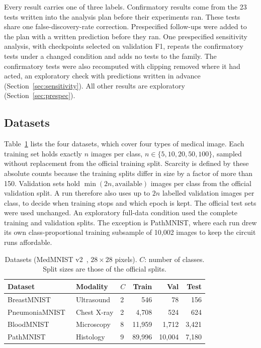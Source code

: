 \documentclass{ieeeaccess}
\begin{document}
Every result carries one of three labels. Confirmatory results come from the 23 tests written into the analysis plan before their experiments ran. These tests share one false-discovery-rate correction. Prespecified follow-ups were added to the plan with a written prediction before they ran. One prespecified sensitivity analysis, with checkpoints selected on validation F1, repeats the confirmatory tests under a changed condition and adds no tests to the family. The confirmatory tests were also recomputed with clipping removed where it had acted, an exploratory check with predictions written in advance (Section~\ref{sec:sensitivity}). All other results are exploratory (Section~\ref{sec:prespec}).

\subsection{Datasets}
Table~\ref{tab:datasets} lists the four datasets, which cover four types of medical image. Each training set holds exactly $n$ images per class, $n\in\{5,10,20,50,100\}$, sampled without replacement from the official training split. Scarcity is defined by these absolute counts because the training splits differ in size by a factor of more than 150. Validation sets hold $\min(2n,\text{available})$ images per class from the official validation split. A run therefore also uses up to $2n$ labelled validation images per class, to decide when training stops and which epoch is kept. The official test sets were used unchanged. An exploratory full-data condition used the complete training and validation splits. The exception is PathMNIST, where each run drew its own class-proportional training subsample of 10,002 images to keep the circuit runs affordable.

\begin{table}[t]
\caption{Datasets (MedMNIST v2~\cite{yang2023}, $28\times28$ pixels). $C$: number of classes. Split sizes are those of the official splits.}
\label{tab:datasets}
\centering
\setlength{\tabcolsep}{3pt}
\footnotesize
\begin{tabular}{@{}lllrrr@{}}
\toprule
Dataset & Modality & $C$ & Train & Val & Test\\
\midrule
BreastMNIST~\cite{aldhabyani2020} & Ultrasound & 2 & 546 & 78 & 156\\
PneumoniaMNIST~\cite{kermany2018} & Chest X-ray & 2 & 4,708 & 524 & 624\\
BloodMNIST~\cite{acevedo2020} & Microscopy & 8 & 11,959 & 1,712 & 3,421\\
PathMNIST~\cite{kather2019} & Histology & 9 & 89,996 & 10,004 & 7,180\\
\bottomrule
\end{tabular}
\end{table}
\end{document}
